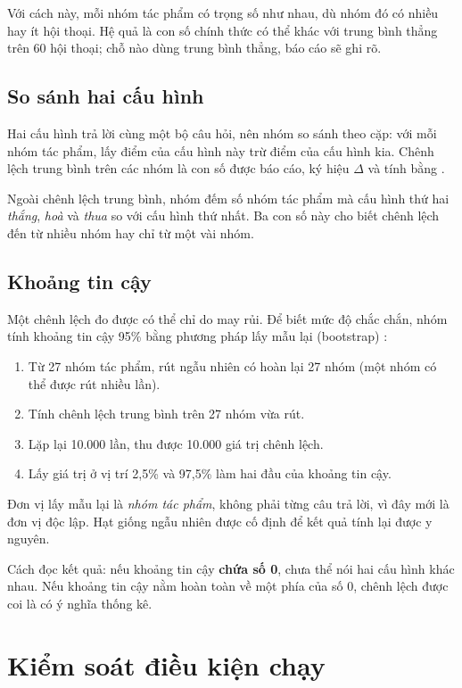 Với cách này, mỗi nhóm tác phẩm có trọng số như nhau, dù nhóm đó có nhiều hay ít hội thoại. Hệ quả là con số chính thức có thể khác với trung bình thẳng trên 60 hội thoại; chỗ nào dùng trung bình thẳng, báo cáo sẽ ghi rõ.

\subsection{So sánh hai cấu hình}

Hai cấu hình trả lời cùng một bộ câu hỏi, nên nhóm so sánh theo cặp: với mỗi nhóm tác phẩm, lấy điểm của cấu hình này trừ điểm của cấu hình kia. Chênh lệch trung bình trên các nhóm là con số được báo cáo, ký hiệu $\Delta$ và tính bằng \pp.

Ngoài chênh lệch trung bình, nhóm đếm số nhóm tác phẩm mà cấu hình thứ hai \emph{thắng}, \emph{hoà} và \emph{thua} so với cấu hình thứ nhất. Ba con số này cho biết chênh lệch đến từ nhiều nhóm hay chỉ từ một vài nhóm.

\subsection{Khoảng tin cậy}

Một chênh lệch đo được có thể chỉ do may rủi. Để biết mức độ chắc chắn, nhóm tính khoảng tin cậy 95\% bằng phương pháp lấy mẫu lại (bootstrap) :

\begin{enumerate}
    \item Từ 27 nhóm tác phẩm, rút ngẫu nhiên có hoàn lại 27 nhóm (một nhóm có thể được rút nhiều lần).
    \item Tính chênh lệch trung bình trên 27 nhóm vừa rút.
    \item Lặp lại 10.000 lần, thu được 10.000 giá trị chênh lệch.
    \item Lấy giá trị ở vị trí 2,5\% và 97,5\% làm hai đầu của khoảng tin cậy.
\end{enumerate}

Đơn vị lấy mẫu lại là \emph{nhóm tác phẩm}, không phải từng câu trả lời, vì đây mới là đơn vị độc lập. Hạt giống ngẫu nhiên được cố định để kết quả tính lại được y nguyên.

Cách đọc kết quả: nếu khoảng tin cậy \textbf{chứa số 0}, chưa thể nói hai cấu hình khác nhau. Nếu khoảng tin cậy nằm hoàn toàn về một phía của số 0, chênh lệch được coi là có ý nghĩa thống kê.

\section{Kiểm soát điều kiện chạy}

